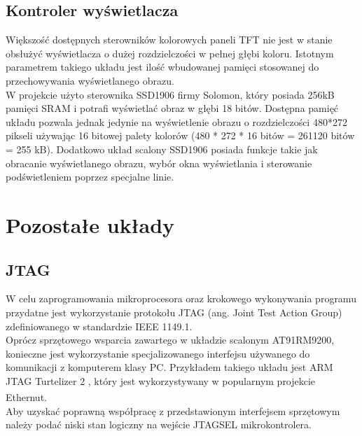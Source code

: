 \documentclass[a4paper,12pt]{book}
\begin{document}
			\subsection{Kontroler wyświetlacza}
				Większość dostępnych sterowników kolorowych paneli TFT nie jest w stanie obsłużyć wyświetlacza o dużej rozdzielczości w pełnej głębi koloru. Istotnym parametrem takiego układu jest ilość wbudowanej pamięci stosowanej do przechowywania wyświetlanego obrazu.\\
				W projekcie użyto sterownika SSD1906 firmy Solomon, który posiada 256kB pamięci SRAM i potrafi wyświetlać obraz w głębi 18 bitów. Dostępna pamięć układu pozwala jednak jedynie na wyświetlenie obrazu o rozdzielczości 480*272 pikseli używając 16 bitowej palety kolorów (480 * 272 * 16 bitów = 261120 bitów = 255 kB). Dodatkowo układ scalony SSD1906 posiada funkcje takie jak obracanie wyświetlanego obrazu, wybór okna wyświetlania i sterowanie podświetleniem poprzez specjalne linie.
		\section{Pozostałe układy}
			\subsection{JTAG}
				\label{sec:jtag}
				W celu zaprogramowania mikroprocesora oraz krokowego wykonywania programu przydatne jest wykorzystanie protokołu JTAG (ang. Joint Test Action Group) zdefiniowanego w standardzie IEEE 1149.1.\\
				Oprócz sprzętowego wsparcia zawartego w układzie scalonym AT91RM9200, konieczne jest wykorzystanie specjalizowanego interfejsu używanego do komunikacji z komputerem klasy PC. Przykładem takiego układu jest ARM JTAG Turtelizer 2 \cite{website:turtelizer2}, który jest wykorzystywany w popularnym projekcie Ethernut\textsuperscript{\textregistered}.\\
				Aby uzyskać poprawną współpracę z przedstawionym interfejsem sprzętowym należy podać niski stan logiczny na wejście JTAGSEL mikrokontrolera.
\end{document}
